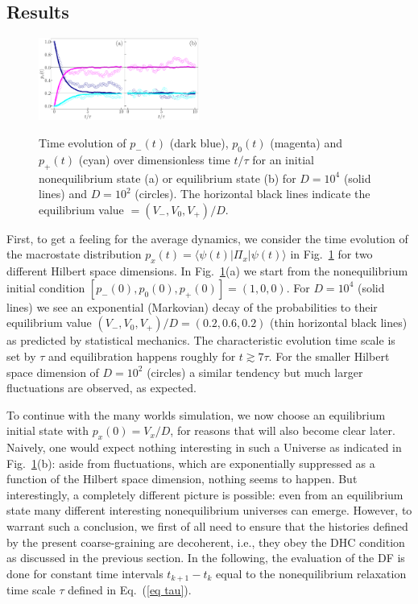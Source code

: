 \documentclass[pre,onecolumn,12pt,aps,longbibliography,nofootinbib]{revtex4-2}
\newcommand{\lr}[1]{{\langle {#1}\rangle}}
\newcommand{\blue}[1]{#1}
\newcommand{\new}[1]{#1}
\begin{document}
\subsection{Results}

\begin{figure}[tb]
 \centering\includegraphics[width=0.47\textwidth,clip=true]{dynamics.pdf}
 \label{fig dynamics}
 \caption{Time evolution of $p_-(t)$ (dark blue), $p_0(t)$ (magenta) and $p_+(t)$ (cyan) over dimensionless time
 $t/\tau$ for an initial nonequilibrium state (a) or equilibrium state (b) for $D=10^4$ (solid lines) and $D=10^2$ (circles). The horizontal black lines indicate the equilibrium value $= (V_-,V_0,V_+)/D$.  }
\end{figure}

First, to get a feeling for the average dynamics, we consider the time evolution of \new{the macrostate distribution $p_x(t) = \lr{\psi(t)|\Pi_x|\psi(t)}$} in Fig.~\ref{fig dynamics} \new{for two different Hilbert space dimensions. In Fig.~\ref{fig dynamics}(a) we start from the nonequilibrium initial condition $[p_-(0),p_0(0),p_+(0)] = (1,0,0)$. For $D=10^4$ (solid lines)} we see an exponential (Markovian) decay of the probabilities to their equilibrium value $(V_-,V_0,V_+)/D = (0.2,0.6,0.2)$ (thin horizontal black lines) as predicted by statistical mechanics. The characteristic evolution time scale is set by $\tau$ and equilibration happens roughly for $t\gtrsim7\tau$. \new{For the smaller Hilbert space dimension of $D=10^2$ (circles) a similar tendency but much larger fluctuations are observed, as expected.}

To continue with the many worlds simulation, we now choose an {equilibrium} initial state with $p_x(0) = V_x/D$, for reasons that will also become clear \blue{later}. Naively, one would expect nothing interesting in such a Universe as indicated in Fig.~\ref{fig dynamics}(b): aside from fluctuations, \new{which are exponentially suppressed as a function of the Hilbert space dimension}, nothing seems to happen. But interestingly, a {completely different picture} is possible: even from an equilibrium state many different interesting nonequilibrium universes \new{can} emerge. However, to warrant such a conclusion, we first of all need to ensure that the histories defined by the present coarse-graining are \new{decoherent}, i.e., they obey the DHC condition as discussed in the previous section. In the following, the evaluation of the DF is done for constant time intervals $t_{k+1}-t_k$ equal to the nonequilibrium relaxation time scale $\tau$ defined in Eq.~(\ref{eq tau}).
\end{document}
